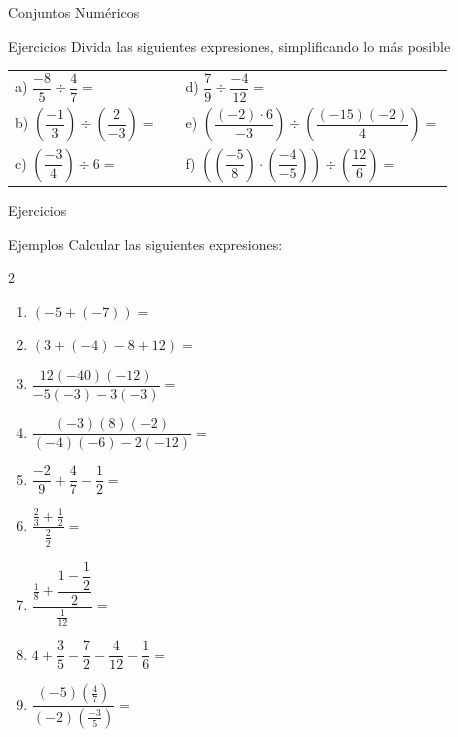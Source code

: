 \documentclass[handout,10pt]{beamer}
\begin{document}
	\begin{frame}{Conjuntos Numéricos}
		\begin{block}{Ejercicios}
			Divida las siguientes expresiones, simplificando lo más posible
			
			\begin{tabular}{lll}
				a) $\dfrac{-8}{5}\div\dfrac{4}{7}=$\pause & &
				d) $\dfrac{7}{9}\div\dfrac{-4}{12}=$\pause \\[0.2cm]
				
				b) $\left(\dfrac{-1}{3}\right)\div\left(\dfrac{2}{-3}\right)=$\pause & &
				e) $\left(\dfrac{(-2)\cdot6}{-3}\right)\div\left(\dfrac{(-15)(-2)}{4}\right)=$\pause \\[0.2cm]
				
				c) $\left(\dfrac{-3}{4}\right)\div6=$\pause & &
				f) $\left(\left(\dfrac{-5}{8}\right)\cdot\left(\dfrac{-4}{-5}\right)\right)\div\left(\dfrac{12}{6}\right)=$
			\end{tabular}
		\end{block}
	\end{frame}
	
	\begin{frame}{Ejercicios}
		\begin{block}{Ejemplos}
			Calcular las siguientes expresiones:
			
			\begin{multicols}{2}
				\begin{enumerate}
					\item $(-5+(-7))=$
					\item $(3+(-4)-8+12)=$
					\item $\dfrac{12(-40)(-12)}{-5(-3)-3(-3)}=$
					\item $\dfrac{(-3)(8)(-2)}{(-4)(-6)-2(-12)}=$
					\item $\dfrac{-2}{9}+\dfrac{4}{7}-\dfrac{1}{2}=$
					\item $\dfrac{\frac{2}{3}+\frac{1}{2}}{\frac{2}{2}}=$
					\item $\dfrac{\frac{1}{8}+\dfrac{1-\dfrac{1}{2}}{2}}{\frac{1}{12}}=$
					\item $4+\dfrac{3}{5}-\dfrac{7}{2}-\dfrac{4}{12}-\dfrac{1}{6}=$
					\item $\dfrac{(-5)\left(\frac{4}{7}\right)}{(-2)\left(\frac{-3}{5}\right)}=$
				\end{enumerate}
			\end{multicols}
		\end{block}
	\end{frame}
	
\end{document}
